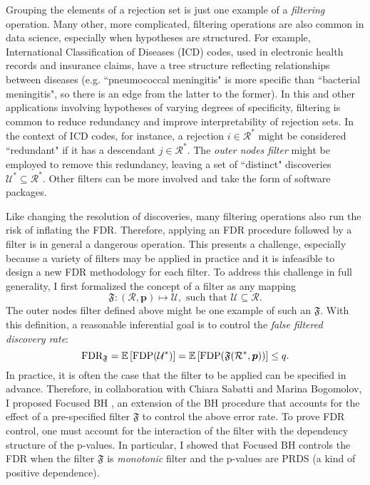 \documentclass[11pt]{article}
\newcommand{\fdp}{\textnormal{FDP}}
\newcommand{\fdr}{\textnormal{FDR}}
\newcommand{\cR}{\mathcal R}
\newcommand{\cU}{\mathcal U}
\newcommand{\F}{\mathfrak F}
\newcommand{\EE}[1]{\mathbb E\left[#1\right]}
\begin{document}
Grouping the elements of a rejection set is just one example of a \textit{filtering} operation. Many other, more complicated, filtering operations are also common in data science, especially when hypotheses are structured. For example, International Classification of Diseases (ICD) codes, used in electronic health records and insurance claims, have a tree structure reflecting relationships between diseases (e.g. ``pneumococcal meningitis" is more specific than ``bacterial meningitis", so there is an edge from the latter to the former). In this and other applications involving hypotheses of varying degrees of specificity, filtering is common to reduce redundancy and improve interpretability of rejection sets. In the context of ICD codes, for instance, a rejection $i \in \cR^*$ might be considered ``redundant" if it has a descendant $j \in \cR^*$. The \textit{outer nodes filter} \cite{Yekutieli} might be employed to remove this redundancy, leaving a set of ``distinct" discoveries $\cU^* \subseteq \cR^*$. Other filters can be more involved and take the form of software packages.

Like changing the resolution of discoveries, many filtering operations also run the risk of inflating the FDR. Therefore, applying an FDR procedure followed by a filter is in general a dangerous operation. This presents a challenge, especially because a variety of filters may be applied in practice and it is infeasible to design a new FDR methodology for each filter. To address this challenge in full generality, I first formalized the concept of a filter as any mapping 
\begin{equation*}
\F: (\cR, \bm p) \mapsto \cU, \text{ such that } \cU \subseteq \cR.
\end{equation*}
The outer nodes filter defined above might be one example of such an $\F$. With this definition, a reasonable inferential goal is to control the \textit{false filtered discovery rate}: 
\begin{equation*}
\fdr_{\F} = \EE{\fdp(\cU^*)} = \EE{\fdp(\F(\cR^*, \bm p))} \leq q.
\end{equation*}
In practice, it is often the case that the filter to be applied can be specified in advance. Therefore, in collaboration with Chiara Sabatti and Marina Bogomolov, I proposed Focused BH \cite{Focused_BH}, an extension of the BH procedure that accounts for the effect of a pre-specified filter $\F$ to control the above error rate. To prove FDR control, one must account for the interaction of the filter with the dependency structure of the p-values. In particular, I showed that Focused BH controls the FDR when the filter $\F$ is \textit{monotonic} filter and the p-values are PRDS (a kind of positive dependence).
\end{document}

